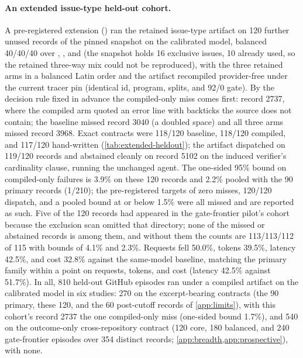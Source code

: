 \paragraph{An extended issue-type held-out cohort.} A pre-registered
extension ()
ran the retained issue-type artifact on 120 further unused records of the
pinned snapshot on the calibrated model, balanced 40/40/40 over ,
, and  (the snapshot holds 16 exclusive
 issues, 10 already used, so the retained three-way mix could
not be reproduced), with the three retained arms in a balanced Latin order and
the artifact recompiled provider-free under the current tracer pin (identical
id, program, splits, and 92/0 gate). By the decision rule fixed in advance the
compiled-only miss comes first: record 2737, where the compiled arm quoted an
error line with backticks the source does not contain; the baseline missed
record 3040 (a doubled space) and all three arms missed record 3968. Exact
contracts were 118/120 baseline, 118/120 compiled, and 117/120 hand-written
(\cref{tab:extended-heldout}); the artifact dispatched on 119/120 records and
abstained cleanly on record 5102 on the induced verifier's cardinality clause,
running the unchanged agent. The one-sided 95\% bound on compiled-only failures
is 3.9\% on these 120 records and 2.2\% pooled with the 90 primary records
(1/210); the pre-registered targets of zero misses, 120/120 dispatch, and a
pooled bound at or below 1.5\% were all missed and are reported as such. Five
of the 120 records had appeared in the gate-frontier pilot's cohort because the
exclusion scan omitted that directory; none of the missed or abstained records
is among them, and without them the counts are 113/113/112 of 115 with bounds
of 4.1\% and 2.3\%.
Requests fell 50.0\%, tokens 39.5\%, latency 42.5\%, and cost 32.8\% against
the same-model baseline, matching the primary family within a point on
requests, tokens, and cost (latency 42.5\% against 51.7\%). In all, 810
held-out GitHub episodes ran under a compiled artifact on the calibrated model
in six studies: 270 on the excerpt-bearing contracts (the 90 primary, these
120, and the 60 post-cutoff records of \cref{app:limits}), with this cohort's
record 2737 the one compiled-only miss (one-sided bound 1.7\%), and 540 on the
outcome-only cross-repository contract (120 core, 180 balanced, and 240
gate-frontier episodes over 354 distinct records; \cref{app:breadth,app:prospective}),
with none.

